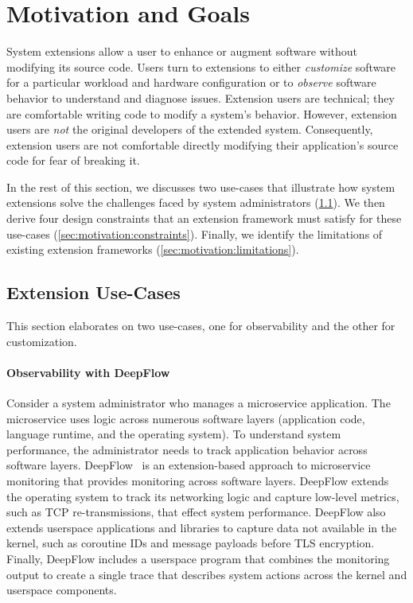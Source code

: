 \section{Motivation and Goals}\label{sec:motivation}

System extensions allow a user to enhance or augment software without modifying its source code.  Users turn to extensions to either \emph{customize} software for a particular workload and hardware configuration or to \emph{observe} software behavior to understand and diagnose issues.   Extension users are technical; they are comfortable writing code to modify a system's behavior.  However, extension users are \emph{not} the original developers of the extended system.  Consequently, extension users are not comfortable directly modifying their application's source code for fear of breaking it.  %

In the rest of this section, we discusses two use-cases that illustrate how system extensions solve the challenges faced by system administrators (\cref{sec:motivation:examples}).  We then derive four design constraints that an extension framework must satisfy for these use-cases (\cref{sec:motivation:constraints}).  Finally, we identify the limitations of existing extension frameworks (\cref{sec:motivation:limitations}).

\subsection{Extension Use-Cases}\label{sec:motivation:examples}

This section elaborates on two use-cases, one for observability and the other for customization.

\paragraph{Observability with DeepFlow}

Consider a system administrator who manages a microservice application.  The microservice uses logic across numerous software layers (application code, language runtime, and the operating system).  To understand system performance, the administrator needs to track application behavior across software layers. DeepFlow~\cite{shen2023network} is an extension-based approach to microservice monitoring that provides monitoring across software layers.  DeepFlow extends the operating system to track its networking logic and capture low-level metrics, such as TCP re-transmissions, that effect system performance.  DeepFlow also extends userspace applications and libraries to capture data not available in the kernel, such as coroutine IDs and message payloads before TLS encryption.  Finally, DeepFlow includes a userspace program that combines the monitoring output to create a single trace that describes system actions across the kernel and userspace components.


